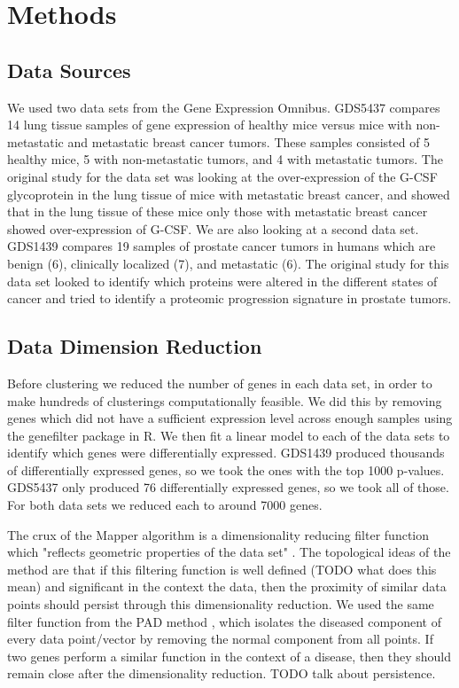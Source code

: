 \documentclass[preprint,10pt]{elsarticle}
\begin{document}
\section{Methods}
\subsection{Data Sources}
We used two data sets from the Gene Expression Omnibus. GDS5437 \cite{gds5437} compares 14 lung tissue samples of gene expression of healthy mice versus mice with non-metastatic and metastatic breast cancer tumors. These samples consisted of 5 healthy mice, 5 with non-metastatic tumors, and 4 with metastatic tumors. The original study for the data set was looking at the over-expression of the G-CSF glycoprotein in the lung tissue of mice with metastatic breast cancer, and showed that in the lung tissue of these mice only those with metastatic breast cancer showed over-expression of G-CSF. We are also looking at a second data set. GDS1439 \cite{gds1439} compares 19 samples of prostate cancer tumors in humans which are benign (6), clinically localized (7), and metastatic (6). The original study for this data set looked to identify which proteins were altered in the different states of cancer and tried to identify a proteomic progression signature in prostate tumors. 


\subsection{Data Dimension Reduction}
	Before clustering we reduced the number of genes in each data set, in order to make hundreds of clusterings computationally feasible. We did this by removing genes which did not have a sufficient expression level across enough samples using the genefilter package in R. We then fit a linear model to each of the data sets to identify which genes were differentially expressed. GDS1439 produced thousands of differentially expressed genes, so we took the ones with the top 1000 p-values. GDS5437 only produced 76 differentially expressed genes, so we took all of those. For both data sets we reduced each to around 7000 genes.
	
	The crux of the Mapper algorithm is a dimensionality reducing filter function which "reflects geometric properties of the data set" \cite{mapper}. The topological ideas of the method are that if this filtering function is well defined (TODO what does this mean) and significant in the context the data, then the proximity of similar data points should persist through this dimensionality reduction. We used the same filter function from the PAD method \cite{nicolau}, which isolates the diseased component of every data point/vector by removing the normal component from all points. If two genes perform a similar function in the context of a disease, then they should remain close after the dimensionality reduction. TODO talk about persistence.
	
\end{document}

